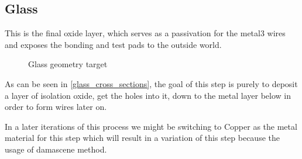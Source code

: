 \subsection{Glass}\label{chapter_glass}

This is the final oxide layer, which serves as a passivation for the metal3 wires and exposes the bonding and test pads
to the outside world.

\begin{figure}[H]
	\centering
	\begin{tikzpicture}[node distance = 3cm, auto, thick,scale=\CrossSectionOnly, every node/.style={transform shape}]
		
	\end{tikzpicture}
	\caption{Glass geometry target}
	\label{glass_cross_sections}
\end{figure}

As can be seen in \autoref{glass_cross_sections}, the goal of this step is purely to deposit a layer of isolation oxide,
get the holes into it, down to the metal layer below in order to form wires later on.

In a later iterations of this process we might be switching to Copper as the metal material for this step which will
result in a variation of this step because the usage of damascene method.
